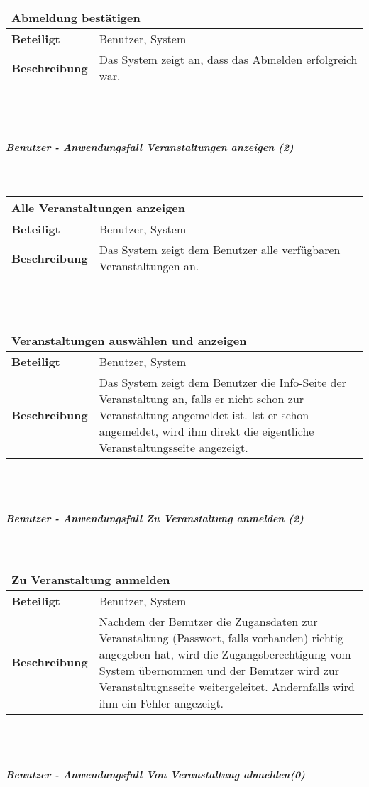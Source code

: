 \documentclass[12pt,a4paper]{article}
\begin{document}
\begin{tabular}{l p{10cm}}
\multicolumn{2}{l}{\textbf{Abmeldung bestätigen}} \\ \hline
\textbf{Beteiligt} & Benutzer, System \\ \hline 
\textbf{Beschreibung} & Das System zeigt an, dass das Abmelden erfolgreich war.\\ 
\hline 
\end{tabular}\\\\
\subparagraph{Benutzer - Anwendungsfall \glqq Veranstaltungen anzeigen \grqq (2)}\mbox{}\\

\begin{tabular}{l p{10cm}}
\multicolumn{2}{l}{\textbf{Alle Veranstaltungen anzeigen}} \\ \hline
\textbf{Beteiligt} & Benutzer, System \\ \hline 
\textbf{Beschreibung} & Das System zeigt dem Benutzer alle verfügbaren Veranstaltungen an.\\ 
\hline 
\end{tabular}\\\\

\begin{tabular}{l p{10cm}}
\multicolumn{2}{l}{\textbf{Veranstaltungen auswählen und anzeigen}} \\ \hline
\textbf{Beteiligt} & Benutzer, System \\ \hline 
\textbf{Beschreibung} & Das System zeigt dem Benutzer die Info-Seite der Veranstaltung an, falls er nicht schon zur Veranstaltung angemeldet ist. Ist er schon angemeldet, wird ihm direkt die eigentliche Veranstaltungsseite angezeigt.\\ 
\hline 
\end{tabular}\\\\

\subparagraph{Benutzer - Anwendungsfall \glqq Zu Veranstaltung anmelden \grqq (2)}\mbox{}\\

\begin{tabular}{l p{10cm}}
\multicolumn{2}{l}{\textbf{Zu Veranstaltung anmelden}} \\ \hline
\textbf{Beteiligt} & Benutzer, System \\ \hline 
\textbf{Beschreibung} & Nachdem der Benutzer die Zugansdaten zur Veranstaltung (Passwort, falls vorhanden) richtig angegeben hat, wird die Zugangsberechtigung vom System übernommen und der Benutzer wird zur Veranstaltugnsseite weitergeleitet. Andernfalls wird ihm ein Fehler angezeigt.\\ 
\hline 
\end{tabular}\\\\
\subparagraph{Benutzer - Anwendungsfall \glqq Von Veranstaltung abmelden\grqq (0)}\mbox{}\\
\end{document}
